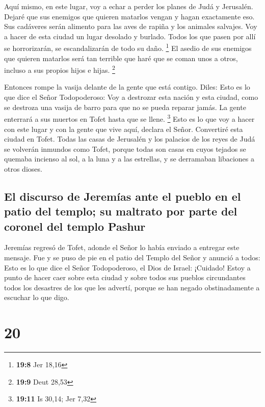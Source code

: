  Aquí mismo, en este lugar, voy a echar a perder los
planes de Judá y Jerusalén. Dejaré que sus enemigos que quieren matarlos
vengan y hagan exactamente eso. Sus cadáveres serán alimento para las
aves de rapiña y los animales salvajes.  Voy a hacer de
esta ciudad un lugar desolado y burlado. Todos los que pasen por allí se
horrorizarán, se escandalizarán de todo su daño. \footnote{\textbf{19:8}
  Jer 18,16}  El asedio de sus enemigos que quieren
matarlos será tan terrible que haré que se coman unos a otros, incluso a
sus propios hijos e hijas. \footnote{\textbf{19:9} Deut 28,53}

 Entonces rompe la vasija delante de la gente que está
contigo.  Diles: Esto es lo que dice el Señor
Todopoderoso: Voy a destrozar esta nación y esta ciudad, como se
destroza una vasija de barro para que no se pueda reparar jamás. La
gente enterrará a sus muertos en Tofet hasta que se llene. \footnote{\textbf{19:11}
  Is 30,14; Jer 7,32}  Esto es lo que voy a hacer con
este lugar y con la gente que vive aquí, declara el Señor. Convertiré
esta ciudad en Tofet.  Todas las casas de Jerusalén y los
palacios de los reyes de Judá se volverán inmundos como Tofet, porque
todas son casas en cuyos tejados se quemaba incienso al sol, a la luna y
a las estrellas, y se derramaban libaciones a otros dioses.

\hypertarget{el-discurso-de-jeremuxedas-ante-el-pueblo-en-el-patio-del-templo-su-maltrato-por-parte-del-coronel-del-templo-pashur}{%
\subsection{El discurso de Jeremías ante el pueblo en el patio del
templo; su maltrato por parte del coronel del templo
Pashur}\label{el-discurso-de-jeremuxedas-ante-el-pueblo-en-el-patio-del-templo-su-maltrato-por-parte-del-coronel-del-templo-pashur}}

 Jeremías regresó de Tofet, adonde el Señor lo había
enviado a entregar este mensaje. Fue y se puso de pie en el patio del
Templo del Señor y anunció a todos:  Esto es lo que dice
el Señor Todopoderoso, el Dios de Israel: ¡Cuidado! Estoy a punto de
hacer caer sobre esta ciudad y sobre todos sus pueblos circundantes
todos los desastres de los que les advertí, porque se han negado
obstinadamente a escuchar lo que digo.

\hypertarget{section-19}{%
\section{20}\label{section-19}}

